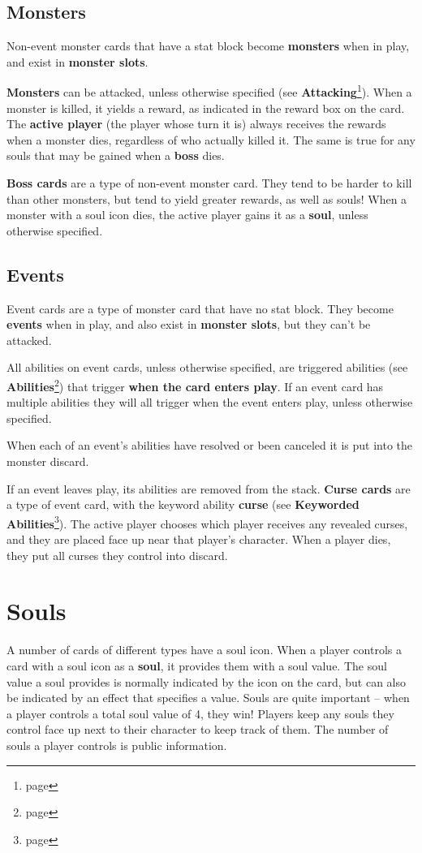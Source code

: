 \documentclass[a4paper, twoside]{report} %
\begin{document}
    \subsection{Monsters}
    Non-event monster cards that have a stat block become \textbf{monsters} when in play, and exist in \textbf{monster slots}.

    \textbf{Monsters} can be attacked, unless otherwise specified (see \textbf{Attacking}\footnote{page \pageref{attacking}}).
    When a monster is killed, it yields a reward, as indicated in the reward box on the card. The \textbf{active player} (the player whose turn it is) always receives the rewards when a monster dies, regardless of who actually killed it. The same is true for any souls that may be gained when a \textbf{boss} dies.

    \textbf{Boss cards} are a type of non-event monster card. They tend to be harder to kill than other monsters, but tend to yield greater rewards, as well as souls! When a monster with a soul icon dies, the active player gains it as a \textbf{soul}, unless otherwise specified.

    \subsection{Events}
    Event cards are a type of monster card that have no stat block. They become \textbf{events} when in play, and also exist in \textbf{monster slots}, but they can’t be attacked.

    All abilities on event cards, unless otherwise specified, are triggered abilities (see \textbf{Abilities}\footnote{page \pageref{abilities}}) that trigger \textbf{when the card enters play}. If an event card has multiple abilities they will all trigger when the event enters play, unless otherwise specified.

    When each of an event’s abilities have resolved or been canceled it is put into the monster discard.

    If an event leaves play, its abilities are removed from the stack.
    \textbf{Curse cards} are a type of event card, with the keyword ability \textbf{curse} (see \textbf{Keyworded Abilities}\footnote{page \pageref{keyworded}}). The active player chooses which player receives any revealed curses, and they are placed face up near that player’s character. When a player dies, they put all curses they control into discard.

    \section{Souls}
    A number of cards of different types have a soul icon. When a player controls a card with a soul icon as a \textbf{soul}, it provides them with a soul value. The soul value a soul provides is normally indicated by the icon on the card, but can also be indicated by an effect that specifies a value. Souls are quite important – when a player controls a total soul value of 4, they win! Players keep any souls they control face up next to their character to keep track of them. The number of souls a player controls is public information.
\end{document}
